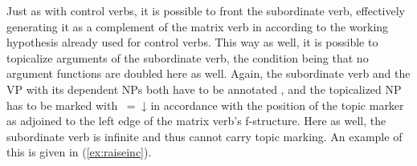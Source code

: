 Just as with control verbs, it is possible to front the subordinate verb,
effectively generating it as a complement of the matrix verb in 
according to the working hypothesis already used for control verbs. This way as
well, it is possible to topicalize arguments of the subordinate verb, the
condition being that no argument functions are doubled here as well. Again, the
subordinate verb and the VP with its dependent NPs both have to be annotated
\pass{\XCompl}, and the topicalized NP has to be marked with
\uncertain{\XCompl}{\Top}~=~↓ in accordance with the position of the topic
marker as adjoined to the left edge of the matrix verb's f-structure. Here as well,
the subordinate verb is infinite and thus cannot carry topic marking.
An example of this is given in (\ref{ex:raiseinc}).

